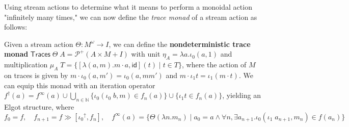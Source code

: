 \documentclass[acmsmall,screen,review]{acmart}
\newcommand{\mc}[1]{\ensuremath{\mathcal{#1}}}
\newcommand{\ms}[1]{\ensuremath{\mathsf{#1}}}
\newcommand{\nats}{\mathbb{N}}
\newcommand{\upg}[2]{{#1}^{\uparrow #2}}
\begin{document}
Using stream actions to determine what it means to perform a monoidal action
"infinitely many times," we can now define the \textit{trace monad} of a stream
action as follows:
\begin{definition}
  Given a stream action \(\Theta: M^\omega \to I\), we can define the
  \textbf{nondeterministic trace monad} \(\ms{Traces}\;\Theta\;A = \mc{P}^+(A
  \times M + I)\) with unit \(\eta_A = \lambda a.\iota_0 (a, 1)\) and
  multiplication
  \(
    \mu_A\;T = \{[\lambda (a, m). m \cdot a, \ms{id}](t) \mid t \in T\}
  \),
  where the action of \(M\) on traces is given by \(m \cdot \iota_0 (a, m') =
  \iota_0 (a, mm')\) and \(m \cdot \iota_1 t = \iota_1 (m \cdot t)\). We can
  equip this monad with an iteration operator \(f^\dagger(a) = f^\infty(a) \cup
  \bigcup_{n \in \nats}\{\iota_0 (\iota_0\;b, m) \in f_n(a)\} \cup \{\iota_1 t
  \in f_n(a)\}\), yielding an Elgot structure, where
  \[
    f_0 = f, \quad f_{n + 1} = f \gg [\upg{\iota_0}{}, f_n], \quad
    f^\infty(a) = \{\Theta (\lambda n. m_n) \mid a_0 = a \land \forall n, \exists a_{n + 1}. \iota_0 (\iota_1\;a_{n + 1}, m_n) \in f(a_n)\}
  \]
\end{definition}
\end{document}
